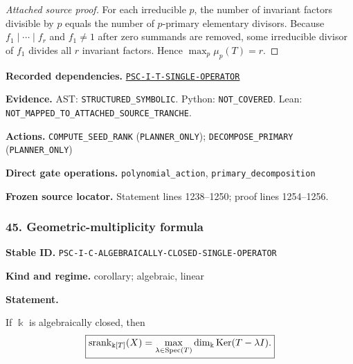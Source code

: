 \documentclass[a4paper,11pt]{article}
\newcommand{\bbk}{\Bbbk}\newcommand{\A}{\mathcal A}\newcommand{\B}{\mathcal B}\newcommand{\Ccal}{\mathcal C}\newcommand{\Pcal}{\mathcal P}\newcommand{\Qcal}{\mathcal Q}\newcommand{\Rcal}{\mathcal R}\newcommand{\Scal}{\mathcal S}
\newcommand{\field}[2]{\noindent\textbf{#1.} #2\par}
\begin{document}
\begin{proof}[Attached source proof]
For each irreducible $p$, the number of invariant factors divisible by $p$ equals the number of $p$-primary elementary divisors.  Because $f_1\mid\cdots\mid f_r$ and $f_1\neq1$ after zero summands are removed, some irreducible divisor of $f_1$ divides all $r$ invariant factors.  Hence $\max_p\mu_p(T)=r$.
\end{proof}
\field{Recorded dependencies}{\hyperref[rec:PSC-I-T-SINGLE-OPERATOR]{\nolinkurl{PSC-I-T-SINGLE-OPERATOR}}}
\field{Evidence}{AST: \nolinkurl{STRUCTURED_SYMBOLIC}. Python: \nolinkurl{NOT_COVERED}. Lean: \nolinkurl{NOT_MAPPED_TO_ATTACHED_SOURCE_TRANCHE}.}
\field{Actions}{\nolinkurl{COMPUTE_SEED_RANK} (\nolinkurl{PLANNER_ONLY}); \nolinkurl{DECOMPOSE_PRIMARY} (\nolinkurl{PLANNER_ONLY})}
\field{Direct gate operations}{\nolinkurl{polynomial_action}, \nolinkurl{primary_decomposition}}
\field{Frozen source locator}{Statement lines 1238--1250; proof lines 1254--1256.}
\subsubsection*{45. Geometric-multiplicity formula}
\label{rec:PSC-I-C-ALGEBRAICALLY-CLOSED-SINGLE-OPERATOR}
\field{Stable ID}{\nolinkurl{PSC-I-C-ALGEBRAICALLY-CLOSED-SINGLE-OPERATOR}}
\field{Kind and regime}{corollary; algebraic, linear}
\textbf{Statement.}\par
If $\bbk$ is algebraically closed, then
\[
\boxed{
\srank_{\bbk[T]}(X)
=
\max_{\lambda\in\operatorname{Spec}(T)}
\dim_{\bbk}\Ker(T-\lambda I).
}
\]
\end{document}
